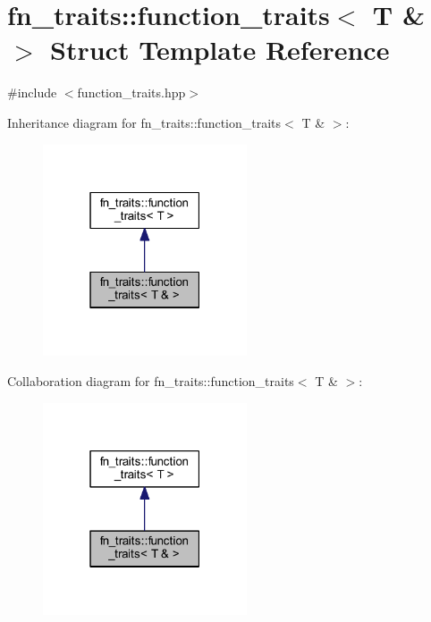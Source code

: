 \hypertarget{structfn__traits_1_1function__traits_3_01_t_01_6_01_4}{}\section{fn\+\_\+traits\+:\+:function\+\_\+traits$<$ T \& $>$ Struct Template Reference}
\label{structfn__traits_1_1function__traits_3_01_t_01_6_01_4}


{\ttfamily \#include $<$function\+\_\+traits.\+hpp$>$}



Inheritance diagram for fn\+\_\+traits\+:\+:function\+\_\+traits$<$ T \& $>$\+:\nopagebreak
\begin{figure}[H]
\begin{center}
\leavevmode
\includegraphics[width=171pt]{db/d2b/structfn__traits_1_1function__traits_3_01_t_01_6_01_4__inherit__graph}
\end{center}
\end{figure}


Collaboration diagram for fn\+\_\+traits\+:\+:function\+\_\+traits$<$ T \& $>$\+:\nopagebreak
\begin{figure}[H]
\begin{center}
\leavevmode
\includegraphics[width=171pt]{d3/d91/structfn__traits_1_1function__traits_3_01_t_01_6_01_4__coll__graph}
\end{center}
\end{figure}


